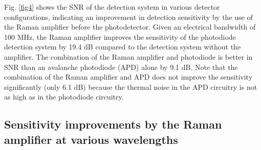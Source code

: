 \documentclass[10pt,letterpaper]{article}
\begin{document}
Fig. \ref{fig4} shows the SNR of the detection system in various detector configurations, indicating an improvement in detection sensitivity by the use of the Raman amplifier before the photodetector. Given an electrical bandwidth of 100 MHz, the Raman amplifier improves the sensitivity of the photodiode detection system by 19.4 dB compared to the detection system without the amplifier. The combination of the Raman amplifier and photodiode is better in SNR than an avalanche photodiode (APD) alone by 9.1 dB. Note that the combination of the Raman amplifier and APD does not improve the sensitivity significantly (only 6.1 dB) because the thermal noise in the APD circuitry is not as high as in the photodiode circuitry.

\subsection{Sensitivity improvements by the Raman amplifier at various wavelengths}
\end{document}
